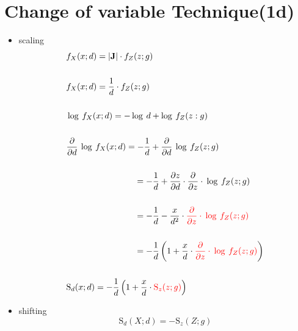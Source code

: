 \documentclass[12pt,a4paper, fleqn]{article}
\begin{document}
\section{Change of variable Technique(1d)}
\begin{itemize}
    \item scaling
    \begin{equation*}
        \begin{aligned}
        &f_X(x;d) = \left|\mathbf{J}\right|\cdot f_Z(z;g)\\
        \\
        &f_X(x;d)=\frac{1}{d}\cdot f_Z(z;g)\\
        \\
        &\log\:f_X(x;d)= - \log\:d + \log\:f_Z(z:g)\\
        \\
        &\frac{\partial}{\partial d}\:\log\:f_X(x;d) = -\frac{1}{d} + \frac{\partial}{\partial d}\:\log\:f_Z(z;g)\\
        \\
        &\hspace{80pt}=-\frac{1}{d}+\frac{\partial z}{\partial d}\cdot\frac{\partial}{\partial z}\cdot\:\log\:f_Z(z;g)\\
        \\
        &\hspace{80pt}=-\frac{1}{d}-\frac{x}{d^2}\cdot\textcolor{red}{\frac{\partial}{\partial z}\cdot\:\log\:f_Z(z;g)}\\
        \\
        &\hspace{80pt}=-\frac{1}{d}\left(1+\frac{x}{d}\cdot\textcolor{red}{\frac{\partial}{\partial z}\cdot\:\log\:f_Z(z;g)}\right)\\
        \\
        &\mathrm{S}_{d}(x;d) = -\frac{1}{d}\left(1+\frac{x}{d}\cdot\textcolor{red}{\mathrm{S}_{z}(z;g)}\right)\\
        \end{aligned}
    \end{equation*}
\end{itemize}
\begin{itemize}
    \item shifting
    \begin{equation*}
        \mathrm{S}_{d}(X;d) = -\mathrm{S}_{z}(Z;g)
    \end{equation*}
\end{itemize}

\newpage
\end{document}
